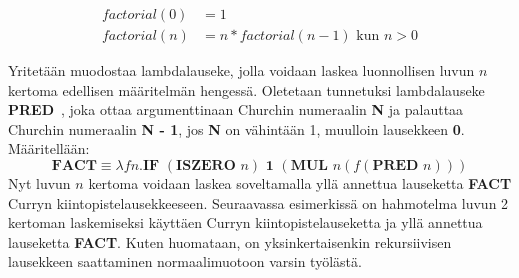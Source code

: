 \begin{align*}
factorial(0) &= 1 \\ 
factorial(n) &= n * factorial(n-1) \text{ kun } n > 0
\end{align*}

Yritetään muodostaa lambdalauseke, jolla voidaan laskea luonnollisen luvun $n$ kertoma edellisen määritelmän hengessä. Oletetaan tunnetuksi lambdalauseke \textbf{PRED}~\cite[s.~8]{Smolka2013}, joka ottaa argumenttinaan Churchin numeraalin \textbf{N} ja palauttaa Churchin numeraalin \textbf{N - 1}, jos \textbf{N} on vähintään 1, muulloin lausekkeen \textbf{0}. Määritellään:
\[ \textbf{FACT} \equiv \lambda f n. \textbf{IF } (\textbf{ISZERO } n) \textbf{ 1 } (\textbf{MUL } n (f (\textbf{PRED } n))) \]
Nyt luvun $n$ kertoma voidaan laskea soveltamalla yllä annettua lauseketta \textbf{FACT} Curryn kiintopistelausekkeeseen. Seuraavassa esimerkissä on hahmotelma luvun 2 kertoman laskemiseksi käyttäen Curryn kiintopistelauseketta ja yllä annettua lauseketta \textbf{FACT}. Kuten huomataan, on yksinkertaisenkin rekursiivisen lausekkeen saattaminen normaalimuotoon varsin työlästä.  

